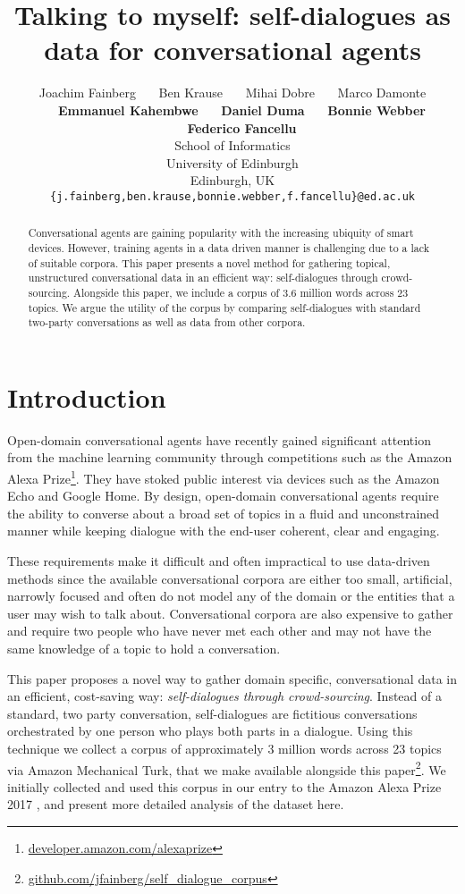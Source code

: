 \documentclass[11pt,a4paper]{article}
\title{Talking to myself: self-dialogues as data for conversational agents}
\author{Joachim Fainberg \ \ \  Ben Krause \ \ \  Mihai Dobre \ \ \  Marco Damonte \\ \ \ \  \textbf{Emmanuel Kahembwe} \ \ \  \textbf{Daniel Duma} \ \ \  \textbf{Bonnie Webber} \ \ \  \textbf{Federico Fancellu} \\
  School of Informatics\\
  University of Edinburgh  \\
  Edinburgh, UK \\
  {\tt \{j.fainberg,ben.krause,bonnie.webber,f.fancellu\}@ed.ac.uk}
  \\}
\date{}
\begin{document}
\maketitle
\begin{abstract}
Conversational agents are gaining popularity with the increasing ubiquity of smart devices. However, training agents in a data driven manner is challenging due to a lack of suitable corpora. This paper presents a novel method for gathering topical, unstructured conversational data in an efficient way: self-dialogues through crowd-sourcing. Alongside this paper, we include a corpus of 3.6 million words across 23 topics. We argue the utility of the corpus by comparing self-dialogues with standard two-party conversations as well as data from other corpora.
\end{abstract}

\section{Introduction}

Open-domain conversational agents have recently gained significant attention from the machine learning community through competitions such as the Amazon Alexa Prize\footnote{\url{developer.amazon.com/alexaprize}}. They have stoked public interest via devices such as the Amazon Echo and Google Home. By design, open-domain conversational agents require the ability to converse about a broad set of topics in a fluid and unconstrained manner while keeping dialogue with the end-user coherent, clear and engaging.

These requirements make it difficult and often impractical to use data-driven methods since the available conversational corpora are either too small, artificial, narrowly focused and often do not model any of the domain or the entities that a user may wish to talk about. Conversational corpora are also expensive to gather and require two people who have never met each other and may not have the same knowledge of a topic to hold a conversation.

This paper proposes a novel way to gather domain specific, conversational data in an efficient, cost-saving way: \textit{self-dialogues through crowd-sourcing}. Instead of a standard, two party conversation, self-dialogues are fictitious conversations orchestrated by one person who plays both parts in a dialogue. Using this technique we collect a corpus of approximately 3 million words across 23 topics via Amazon Mechanical Turk, that we make available alongside this paper\footnote{\url{github.com/jfainberg/self\_dialogue\_corpus}}. We initially collected and used this corpus in our entry to the Amazon Alexa Prize 2017 \cite{krause2017edina}, and present more detailed analysis of the dataset here.
\end{document}
